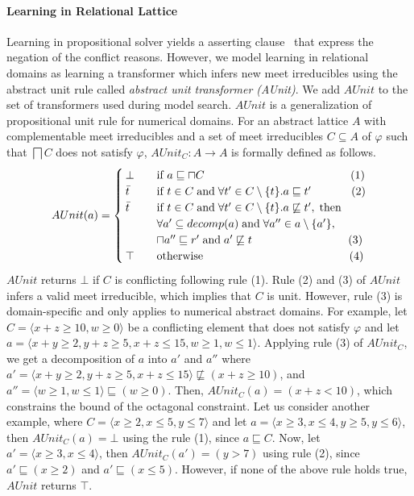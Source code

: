 \paragraph{\textbf{Learning in Relational Lattice}}
Learning in propositional solver yields a asserting clause~\cite{cdcl} 
that express the negation of the conflict reasons.  However, we model 
learning in relational domains as learning a transformer which infers 
new meet irreducibles using the abstract unit rule called 
{\em abstract unit transformer (AUnit)}.  We add $AUnit$ to the set of 
transformers  used during model search. $AUnit$ is 
a generalization of propositional unit rule for numerical domains.  For 
an abstract lattice $A$ with complementable meet irreducibles and a set 
of meet irreducibles $C \subseteq A$ of $\varphi$ such that $\bigsqcap C$ does not 
satisfy $\varphi$, $AUnit_C: A \rightarrow A$ is formally defined as follows. 
\[ AUnit(a) =
 \begin{cases}
  \bot       & \quad \text{if } a \sqsubseteq \sqcap{C} \qquad \qquad \qquad
  \qquad \qquad \qquad \quad (1)\\
  \bar{t}    & \quad \text{if } t \in C \; \text{and} \; \forall t' \in C
  \setminus \{t\}. a  \sqsubseteq t' \qquad \quad \; \; (2) \\
  \bar{t}    & \quad \text{if } t \in C \; \text{and} \; \forall t' \in C \setminus \{t\}. a
  \not\sqsubseteq t', \; \text{then} \\ 
             & \quad \forall a' \subseteq decomp(a) \;  \text{and} \; \forall a'' \in a \setminus \{a'\}, \\ 
             & \quad \sqcap{a''} \sqsubseteq r' \; \text{and} \; a'
             \not\sqsubseteq t   \qquad \qquad \qquad \qquad \; \; (3) \\
  \top & \quad \text{otherwise} \qquad \qquad \qquad \qquad \qquad \qquad \quad (4) \\
 \end{cases}
\]
$AUnit$ returns $\bot$ if $C$ is conflicting following rule (1).  Rule (2) and
(3) of $AUnit$ infers a valid meet irreducible, which implies that $C$ is unit. 
However, rule (3) is domain-specific and only applies to numerical abstract
domains.  For example, let $C = \langle x+z \geq 10,  w \geq 0 \rangle$ 
be a conflicting element that does not satisfy $\varphi$ and let $a= \langle x+y \geq 2, y+z \geq 5,
x+z \leq 15, w \geq 1, w \leq 1 \rangle$.  Applying rule (3) of $AUnit_C$, we get a 
decomposition of $a$ into $a'$ and $a''$ where 
$a'= \langle x+y \geq 2, y+z \geq 5, x+z \leq 15 \rangle \not\sqsubseteq (x+z \geq 10)$, and 
$a''= \langle w \geq 1, w \leq 1 \rangle \sqsubseteq (w \geq 0)$.  Then, $AUnit_C(a) = (x+z < 10)$, 
which constrains the bound of the octagonal constraint.  
Let us consider another example, where $C = \langle x \geq 2, x \leq 5, y \leq 7 \rangle$
and let $a = \langle x \geq 3, x \leq 4, y \geq 5, y \leq 6 \rangle$, then $AUnit_C(a) = \bot$ using
the rule (1), since $a \sqsubseteq C$.  Now, let $a' = \langle x \geq 3, x \leq 4 \rangle$, 
then $AUnit_C(a') = (y > 7)$ using rule (2), since $a' \sqsubseteq (x \geq 2)$
and $a' \sqsubseteq (x \leq 5)$.  However, if none of the above rule holds true, $AUnit$ 
returns $\top$.   
 

